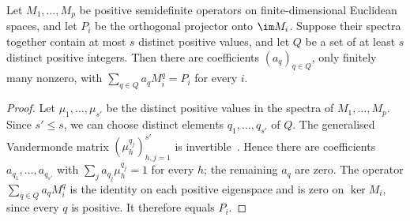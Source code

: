 \begin{lemma}\label{lem:positive-interpolation}
 Let $M_1,\ldots,M_p$ be positive semidefinite operators on finite-dimensional
 Euclidean spaces, and let $P_i$ be the orthogonal projector onto $\im M_i$.
 Suppose their spectra together contain at most $s$ distinct positive values,
 and let $Q$ be a set of at least $s$ distinct positive integers.
 Then there are coefficients $(a_q)_{q\in Q}$, only finitely many nonzero,
 with $\sum_{q\in Q}a_qM_i^q=P_i$ for every $i$.
\end{lemma}
\begin{proof}
 Let $\mu_1,\ldots,\mu_{s'}$ be the distinct positive
 values in the spectra of $M_1,\ldots,M_p$.
 Since $s'\leq s$, we can choose distinct elements $q_1,\ldots,q_{s'}$ of $Q$.
 The generalised Vandermonde matrix $(\mu_h^{q_j})_{h,j=1}^{s'}$ is
 invertible~\cite[p.~76]{GantmacherKrein2002}.
 Hence there are coefficients $a_{q_1},\ldots,a_{q_{s'}}$ with
 $\sum_ja_{q_j}\mu_h^{q_j}=1$ for every $h$; the remaining $a_q$ are zero.
 The operator $\sum_{q\in Q}a_qM_i^q$ is the identity on each positive
 eigenspace and is zero on $\ker M_i$, since every $q$ is positive.
 It therefore equals $P_i$.
\end{proof}

